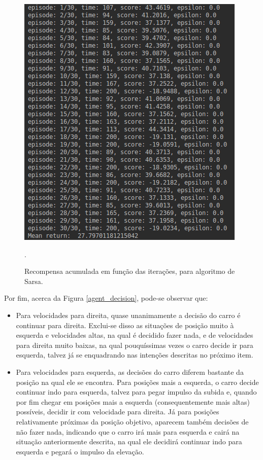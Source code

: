 \documentclass[conference]{IEEEtran}
\begin{document}
\begin{figure}[htbp]
\centering
\centerline{\includegraphics[scale=0.4]{imagens/evaluate_dqn_result.png}}
\caption{Recompensa acumulada em função das iterações, para algoritmo de Sarsa.}.
\label{evaluate_dqn_result}
\end{figure}
	
	Por fim, acerca da Figura \ref{agent_decision}, pode-se observar que:
	
\begin{itemize}

\item Para velocidades para direita, quase unanimamente a decisão do carro é continuar para direita. Exclui-se disso as situações de posição muito à esquerda e velocidades altas, na qual é decidido fazer nada, e de velocidades para direita muito baixas, na qual pouquíssimas vezes o carro decide ir para esquerda, talvez já se enquadrando nas intenções descritas no próximo item.

\item Para velocidades para esquerda, as decisões do carro diferem bastante da posição na qual ele se encontra. Para posições mais a esquerda, o carro decide continuar indo para esquerda, talvez para pegar impulso da subida e, quando por fim chegar em posições mais a esquerda (consequentemente mais altas) possíveis, decidir ir com velocidade para direita. Já para posições relativamente próximas da posição objetivo, aparecem também decisões de não fazer nada, indicando que o carro irá mais para esquerda e cairá na situação anteriormente descrita, na qual ele decidirá continuar indo para esquerda e pegará o impulso da elevação.

\end{itemize}
\end{document}
